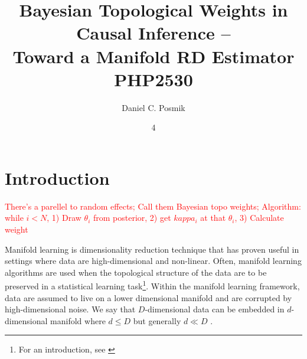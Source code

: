 \documentclass[twoside,11pt]{article}
\begin{document}
\title{Bayesian Topological Weights in Causal Inference -- \\ Toward a Manifold RD Estimator \\
\vspace{.1in}
PHP2530			
}

\author{ Daniel C. Posmik }

\maketitle
\date{4 }

\section{Introduction} \label{sc:intro}

\textcolor{red}{There's a parellel to random effects; Call them Bayesian topo weights; Algorithm: while $i < N$, 1) Draw $\theta_i$ from posterior, 2) get $kappa_i$ at that $\theta_i$, 3) Calculate weight}

Manifold learning is dimensionality reduction technique that has proven useful in settings where data are high-dimensional and non-linear. Often, manifold learning algorithms are used when the topological structure of the data are to be preserved in a statistical learning task\footnote{For an introduction, see \citet{Meila2023}}. Within the manifold learning framework, data are assumed to live on a lower dimensional manifold and are corrupted by high-dimensional noise. We say that $D$-dimensional data can be embedded in $d$-dimensional manifold where $d \leq D$ but generally $d \ll D$ .  
\end{document}
